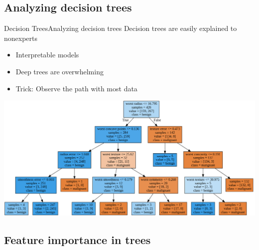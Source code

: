 \documentclass[10pt,compress]{beamer} %
\begin{document}
\subsection{Analyzing decision trees}

\begin{frame}{Decision Trees}{Analyzing decision trees}
    Decision trees are easily explained to nonexperts
    \begin{itemize}
        \item Interpretable models
        \item Deep trees are overwhelming
        \item Trick: Observe the path with most data
    \end{itemize}

    \centering \includegraphics[width=\linewidth]{figs/tree-cancer.png}
\end{frame}

\subsection{Feature importance in trees}
\end{document}
